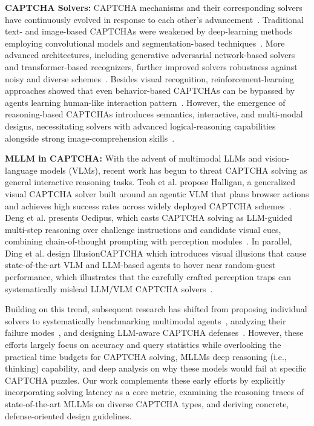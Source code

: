 \documentclass[sigconf, review]{acmart}
\begin{document}
\textbf{CAPTCHA Solvers:}  CAPTCHA mechanisms and their corresponding solvers have continuously evolved in response to each other's advancement~\cite{ousat2024matter,searles2023modern}. Traditional text- and image-based CAPTCHAs were weakened by deep-learning methods employing convolutional models and segmentation-based techniques~\cite{sivakorn2016robot,tian2020generic,shi2020text}. More advanced architectures, including generative adversarial network-based solvers and transformer-based recognizers, further improved solvers robustness against noisy and diverse schemes~\cite{ye2018yet,zhao2023geesolver}. Besides visual recognition, reinforcement-learning approaches showed that even behavior-based CAPTCHAs can be bypassed by agents learning human-like interaction pattern~\cite{akrout2019hacking, tsingenopoulos2022captcha}. However, the emergence of reasoning-based CAPTCHAs introduces semantics, interactive, and multi-modal designs, necessitating solvers with advanced logical-reasoning capabilities alongside strong image-comprehension skills~\cite{gao2021research,wu2025mca,captchaworld25}.

\textbf{MLLM in CAPTCHA:} With the advent of multimodal LLMs and vision-language models (VLMs), recent work has begun to threat CAPTCHA solving as general interactive reasoning tasks. Teoh et al. propose Halligan, a generalized visual CAPTCHA solver built around an agentic VLM that plans browser actions and achieves high success rates across widely deployed CAPTCHA schemes~\cite{teoh2025captchas}. Deng et al. presents Oedipus, which casts CAPTCHA solving as LLM-guided multi-step reasoning over challenge instructions and candidate visual cues, combining chain-of-thought prompting with perception modules~\cite{deng2024oedipus}. In parallel, Ding et al. design IllusionCAPTCHA which introduces visual illusions that cause state-of-the-art VLM and LLM-based agents to hover near random-guest performance, which illustrates that the carefully crafted perception traps can systematically mislead LLM/VLM CAPTCHA solvers~\cite{ding2025illusioncaptcha}.

Building on this trend, subsequent research has shifted from proposing individual solvers to systematically benchmarking multimodal agents~\cite{captchaworld25, wu2025mca}, analyzing their failure modes~\cite{song2025reasoning}, and designing LLM-aware CAPTCHA defenses~\cite{li2025mi}. However, these efforts largely focus on accuracy and query statistics while overlooking the practical time budgets for CAPTCHA solving, MLLMs deep reasoning (i.e., thinking) capability, and deep analysis on why these models would fail at specific CAPTCHA puzzles. Our work complements these early efforts by explicitly incorporating solving latency as a core metric, examining the reasoning traces of state-of-the-art MLLMs on diverse CAPTCHA types, and deriving concrete, defense-oriented design guidelines.
\end{document}

